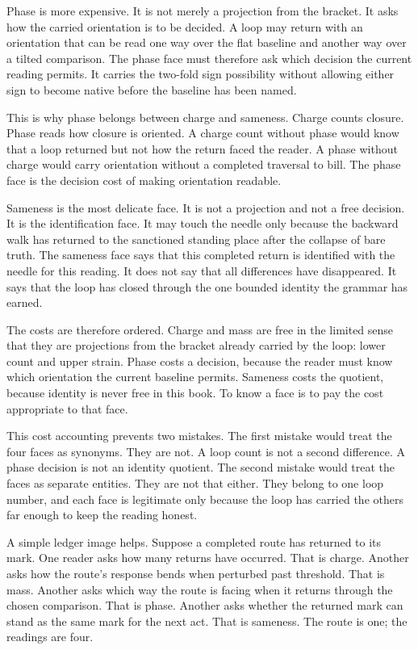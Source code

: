 Phase is more expensive. It is not merely a projection from the bracket. It
asks how the carried orientation is to be decided. A loop may return with an
orientation that can be read one way over the flat baseline and another way
over a tilted comparison. The phase face must therefore ask which decision
the current reading permits. It carries the two-fold sign possibility without
allowing either sign to become native before the baseline has been named.

This is why phase belongs between charge and sameness. Charge counts closure.
Phase reads how closure is oriented. A charge count without phase would know
that a loop returned but not how the return faced the reader. A phase without
charge would carry orientation without a completed traversal to bill. The
phase face is the decision cost of making orientation readable.

Sameness is the most delicate face. It is not a projection and not a free
decision. It is the identification face. It may touch the needle only because
the backward walk has returned to the sanctioned standing place after the
collapse of bare truth. The sameness face says that this completed return is
identified with the needle for this reading. It does not say that all
differences have disappeared. It says that the loop has closed through the
one bounded identity the grammar has earned.

The costs are therefore ordered. Charge and mass are free in the limited
sense that they are projections from the bracket already carried by the loop:
lower count and upper strain. Phase costs a decision, because the reader must
know which orientation the current baseline permits. Sameness costs the
quotient, because identity is never free in this book. To know a face is to
pay the cost appropriate to that face.

This cost accounting prevents two mistakes. The first mistake would treat
the four faces as synonyms. They are not. A loop count is not a second
difference. A phase decision is not an identity quotient. The second mistake
would treat the faces as separate entities. They are not that either. They
belong to one loop number, and each face is legitimate only because the loop
has carried the others far enough to keep the reading honest.

A simple ledger image helps. Suppose a completed route has returned to its
mark. One reader asks how many returns have occurred. That is charge. Another
asks how the route's response bends when perturbed past threshold. That is
mass. Another asks which way the route is facing when it returns through the
chosen comparison. That is phase. Another asks whether the returned mark can
stand as the same mark for the next act. That is sameness. The route is one;
the readings are four.


